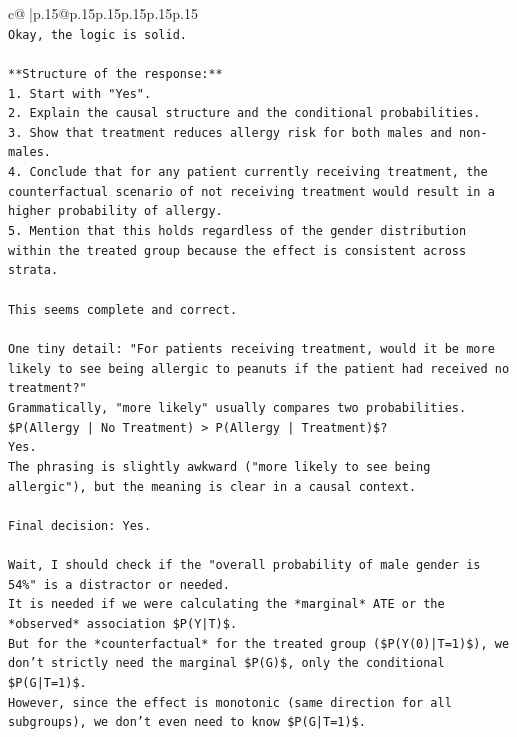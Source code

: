 \documentclass{article}
\begin{document}
{\begin{supertabular}{c@{$\;$}|p{.15\linewidth}@{}p{.15\linewidth}p{.15\linewidth}p{.15\linewidth}p{.15\linewidth}p{.15\linewidth}}
{{{\\ 
\texttt{Okay, the logic is solid.} \\
\\ 
\texttt{**Structure of the response:**} \\
\texttt{1. Start with "Yes".} \\
\texttt{2. Explain the causal structure and the conditional probabilities.} \\
\texttt{3. Show that treatment reduces allergy risk for both males and non{-}males.} \\
\texttt{4. Conclude that for any patient currently receiving treatment, the counterfactual scenario of not receiving treatment would result in a higher probability of allergy.} \\
\texttt{5. Mention that this holds regardless of the gender distribution within the treated group because the effect is consistent across strata.} \\
\\ 
\texttt{This seems complete and correct.} \\
\\ 
\texttt{One tiny detail: "For patients receiving treatment, would it be more likely to see being allergic to peanuts if the patient had received no treatment?"} \\
\texttt{Grammatically, "more likely" usually compares two probabilities.} \\
\texttt{\$P(Allergy | No Treatment) > P(Allergy | Treatment)\$?} \\
\texttt{Yes.} \\
\texttt{The phrasing is slightly awkward ("more likely to see being allergic"), but the meaning is clear in a causal context.} \\
\\ 
\texttt{Final decision: Yes.} \\
\\ 
\texttt{Wait, I should check if the "overall probability of male gender is 54\%" is a distractor or needed.} \\
\texttt{It is needed if we were calculating the *marginal* ATE or the *observed* association \$P(Y|T)\$.} \\
\texttt{But for the *counterfactual* for the treated group (\$P(Y(0)|T=1)\$), we don't strictly need the marginal \$P(G)\$, only the conditional \$P(G|T=1)\$.} \\
\texttt{However, since the effect is monotonic (same direction for all subgroups), we don't even need to know \$P(G|T=1)\$.} \\
}}}
\end{supertabular}}
\end{document}
